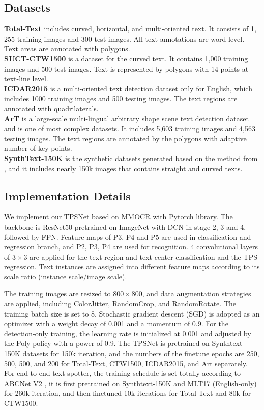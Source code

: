 \documentclass[sigconf]{acmart}
\begin{document}
	\subsection{Datasets}
	\noindent \textbf{Total-Text}  \cite{ch2017total} includes curved, horizontal, and multi-oriented text. It consists of 1, 255 training images and 300 test images. All text annotations are word-level. Text areas are annotated with polygons.\\
	\textbf{SUCT-CTW1500} \cite{yuan2019ctw} is a dataset for the curved text. It contains 1,000 training images and 500 test images. Text is represented by polygons with 14 points at text-line level.\\
	\textbf{ICDAR2015}  \cite{karatzas2015icdar2015} is a multi-oriented text detection dataset only for English, which includes 1000 training images and 500 testing images. The text regions are annotated with quadrilaterals.\\
	\textbf{ArT} \cite{chng2019icdar2019} is a large-scale multi-lingual arbitrary shape
	scene text detection dataset and is one of most complex datasets. It includes 5,603 training images and 4,563 testing images. The text regions are annotated by the polygons with adaptive number of key points.\\
	\textbf{SynthText-150K}  \cite{Liu2020ABCNet} is the synthetic datasets generated based on the method from  \cite{gupta2016synthetic}, and it includes nearly 150k images that contains straight and curved texts. 
	
	\subsection{Implementation Details}
	We implement our TPSNet based on MMOCR   \cite{kuang2021mmocr} with Pytorch   \cite{paszke2019pytorch} library. The backbone is ResNet50 pretrained on ImageNet with DCN in stage 2, 3 and 4, followed by FPN. Feature maps of P3, P4 and P5 are used in classification and regression branch, and P2, P3, P4 are used for recognition. 4 convolutional layers of $3\times3$ are applied for the text region and text center classification and the TPS regression.
	Text instances are assigned into different feature maps according to its scale ratio (instance scale/image scale).


	The training images are resized to $800\times800$, and data augmentation strategies are applied, including ColorJitter, RandomCrop, and RandomRotate. The training batch size is set to 8. Stochastic gradient descent (SGD) is adopted as an optimizer with a weight decay of 0.001 and a momentum of 0.9. For the detection-only training, the learning rate is initialized at 0.001 and adjusted by the Poly policy with a power of 0.9. The TPSNet is pretrained on Synthtext-150K datasets for 150k iteration, and the numbers of the finetune epochs are 250, 500, 500, and 200 for Total-Text, CTW1500, ICDAR2015, and Art separately. For end-to-end text spotter, the training schedule is set totally according to ABCNet V2 \cite{abcnetv2}, it is first pretrained on Synthtext-150K and MLT17 (English-only) for 260k iteration, and then finetuned 10k iterations for Total-Text and 80k for CTW1500.
	
\end{document}
